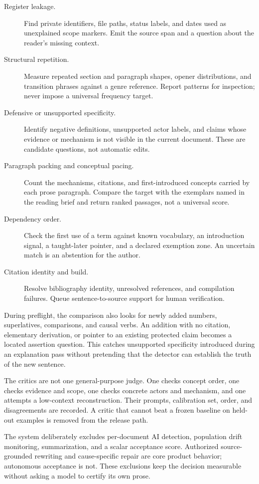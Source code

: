 \begin{description}
\item[Register leakage.] Find private identifiers, file paths, status labels,
  and dates used as unexplained scope markers. Emit the source span and a
  question about the reader's missing context.
\item[Structural repetition.] Measure repeated section and paragraph shapes,
  opener distributions, and transition phrases against a genre reference.
  Report patterns for inspection; never impose a universal frequency target.
\item[Defensive or unsupported specificity.] Identify negative definitions,
  unsupported actor labels, and claims whose evidence or mechanism is not
  visible in the current document. These are candidate questions, not automatic
  edits.
\item[Paragraph packing and conceptual pacing.] Count the mechanisms,
  citations, and first-introduced concepts carried by each prose paragraph.
  Compare the target with the exemplars named in the reading brief and return
  ranked passages, not a universal score.
\item[Dependency order.] Check the first use of a term against known
  vocabulary, an introduction signal, a taught-later pointer, and a declared
  exemption zone. An uncertain match is an abstention for the author.
\item[Citation identity and build.] Resolve bibliography identity, unresolved
  references, and compilation failures. Queue sentence-to-source support for
  human verification.
\end{description}

During preflight, the comparison also looks for newly added numbers,
superlatives, comparisons, and causal verbs. An addition with no citation,
elementary derivation, or pointer to an existing protected claim becomes a
located assertion question. This catches unsupported specificity introduced
during an explanation pass without pretending that the detector can establish
the truth of the new sentence.

The critics are not one general-purpose judge. One checks concept order, one
checks evidence and scope, one checks concrete actors and mechanism, and one
attempts a low-context reconstruction. Their prompts, calibration set, order,
and disagreements are recorded. A critic that cannot beat a frozen baseline on
held-out examples is removed from the release path.

The system deliberately excludes per-document AI detection, population drift
monitoring, summarization, and a scalar acceptance score. Authorized
source-grounded rewriting and cause-specific repair are core product behavior;
autonomous acceptance is not. These exclusions keep the decision measurable
without asking a model to certify its own prose.

